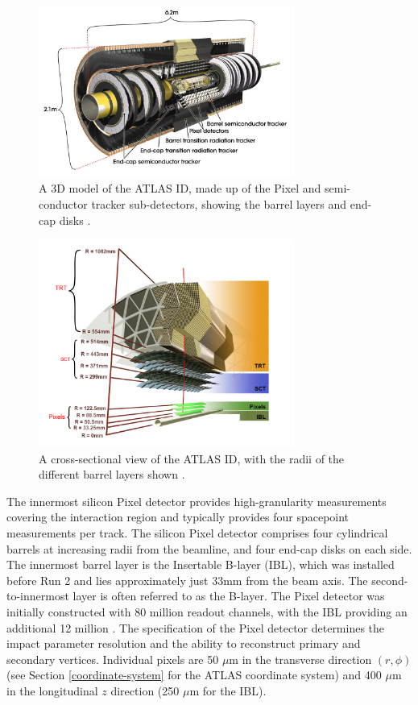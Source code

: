 \begin{figure}[!htbp]
  \centering
  \includegraphics[width=0.75\textwidth]{images/2-LHC-ATLAS/atlas_id.jpg}
  \caption{
    A 3D model of the ATLAS ID, made up of the Pixel and semi-conductor tracker sub-detectors, showing the barrel layers and end-cap disks \cite{atlasid}.
  }
  \label{fig:atlas-id-run1}
\end{figure}

\begin{figure}[!htbp]
  \centering
  \includegraphics[width=0.75\textwidth]{images/2-LHC-ATLAS/atlas_id_xs.png}
  \caption{
    A cross-sectional view of the ATLAS ID, with the radii of the different barrel layers shown \cite{atlastrackingdocs}.
  }
  \label{fig:atlas-id-run2}
\end{figure}

The innermost silicon Pixel detector \cite{pixel} provides high-granularity measurements covering the interaction region and typically provides four spacepoint measurements per track. The silicon Pixel detector comprises four cylindrical barrels at increasing radii from the beamline, and four end-cap disks on each side. The innermost barrel layer is the Insertable B-layer (IBL), which was installed before Run 2 \cite{ATLAS-TDR-19,PIX-2018-001} and lies approximately just 33mm from the beam axis. The second-to-innermost layer is often referred to as the B-layer. The Pixel detector was initially constructed with 80 million readout channels, with the IBL providing an additional 12 million \cite{ibl}. The specification of the Pixel detector determines the impact parameter resolution and the ability to reconstruct primary and secondary vertices. Individual pixels are 50 $\mu$m in the transverse direction $(r,\phi)$ (see Section \ref{coordinate-system} for the ATLAS coordinate system) and 400 $\mu$m in the longitudinal $z$ direction (250 $\mu$m for the IBL). 

